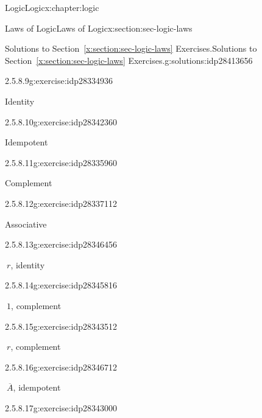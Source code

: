 \documentclass[twoside,10pt,]{book}
\newcommand{\xreffont}{\relax}
\numberwithin{equation}{section}
\begin{document}
\begin{chapterptx}{Logic}{}{Logic}{}{}{x:chapter:logic}
\begin{sectionptx}{Laws of Logic}{}{Laws of Logic}{}{}{x:section:sec-logic-laws}
\begin{solutions-subsection}{Solutions to Section~{\xreffont\ref*{x:section:sec-logic-laws}} Exercises.}{}{Solutions to Section~{\xreffont\ref*{x:section:sec-logic-laws}} Exercises.}{}{}{g:solutions:idp28413656}
\begin{exercisegroup}
\begin{divisionsolutioneg}{2.5.8.9}{}{g:exercise:idp28334936}%
\par\smallskip%
\noindent\hypertarget{g:solution:idp28335576-main}{}Identity\end{divisionsolutioneg}%
\begin{divisionsolutioneg}{2.5.8.10}{}{g:exercise:idp28342360}%
\par\smallskip%
\noindent\hypertarget{g:solution:idp28335832-main}{}Idempotent\end{divisionsolutioneg}%
\begin{divisionsolutioneg}{2.5.8.11}{}{g:exercise:idp28335960}%
\par\smallskip%
\noindent\hypertarget{g:solution:idp28336600-main}{}Complement\end{divisionsolutioneg}%
\begin{divisionsolutioneg}{2.5.8.12}{}{g:exercise:idp28337112}%
\par\smallskip%
\noindent\hypertarget{g:solution:idp28343640-main}{}Associative\end{divisionsolutioneg}%
\end{exercisegroup}
\par\medskip\noindent
\begin{exercisegroup}
\begin{divisionsolutioneg}{2.5.8.13}{}{g:exercise:idp28346456}%
\par\smallskip%
\noindent\hypertarget{g:solution:idp28347736-main}{}\(\ r\), identity\end{divisionsolutioneg}%
\begin{divisionsolutioneg}{2.5.8.14}{}{g:exercise:idp28345816}%
\par\smallskip%
\noindent\hypertarget{g:solution:idp28347992-main}{}\(\ 1\), complement\end{divisionsolutioneg}%
\begin{divisionsolutioneg}{2.5.8.15}{}{g:exercise:idp28343512}%
\par\smallskip%
\noindent\hypertarget{g:solution:idp28345304-main}{}\(\ r\), complement\end{divisionsolutioneg}%
\begin{divisionsolutioneg}{2.5.8.16}{}{g:exercise:idp28346712}%
\par\smallskip%
\noindent\hypertarget{g:solution:idp28350552-main}{}\(\ \overline{A}\), idempotent\end{divisionsolutioneg}%
\begin{divisionsolutioneg}{2.5.8.17}{}{g:exercise:idp28343000}%

\end{divisionsolutioneg}
\end{exercisegroup}
\end{solutions-subsection}
\end{sectionptx}
\end{chapterptx}
\end{document}
